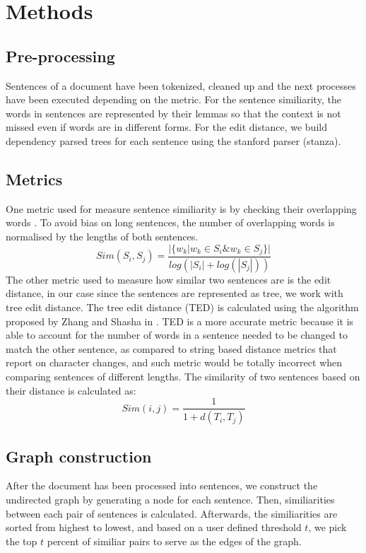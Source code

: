 \documentclass[9pt,twocolumn,twoside]{pnas-report}
\begin{document}
{\small\section*{Methods}
\subsection*{Pre-processing}
Sentences of a document have been tokenized, cleaned up and the next processes have been executed depending on the metric. For the sentence similiarity, the words in sentences are represented by their lemmas so that the context is not missed even if words are in different forms. For the edit distance, we build dependency parsed trees for each sentence using the stanford parser (stanza).
\subsection*{Metrics}
One metric used for measure sentence similiarity is by checking their overlapping words \cite{MH}. To avoid bias on long sentences, the number of overlapping words is normalised by the lengths of both sentences. 
\[
Sim(S_{i}, S_{j}) = \frac{|\{w_{k}|w_{k} \in S_{i} \& w_{k} \in S_{j}\}|}{log(|S_{i}| + log(|S_{j}|))}	
\]
The other metric used to measure how similar two sentences are is the edit distance, in our case since the sentences are represented as tree, we work with tree edit distance. The tree edit distance (TED) \cite{GSGA} is calculated using the algorithm proposed by Zhang and Shasha in \cite{ZSSS}. TED is a more accurate metric because it is able to account for the number of words in a sentence needed to be changed to match the other sentence, as compared to string based distance metrics that report on character changes, and such metric would be totally incorrect when comparing sentences of different lengths. The similarity of two sentences based on their distance is calculated as: 
\[
Sim(i, j) = \frac{1}{1 + d(T_{i}, T_{j})}	
\]
\subsection*{Graph construction}
After the document has been processed into sentences, we construct the undirected graph by generating a node for each sentence. Then, similiarities between each pair of sentences is calculated. Afterwards, the similiarities are sorted from highest to lowest, and based on a user defined threshold $t$, we pick the top $t$ percent of similiar pairs to serve as the edges of the graph. 

}
\end{document}
